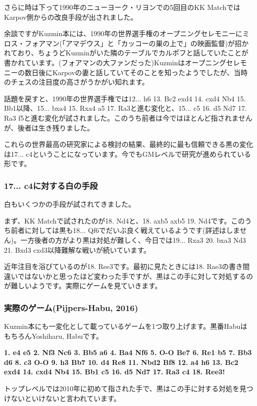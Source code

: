 さらに時は下って1990年のニューヨーク・リヨンでの5回目のKK MatchではKarpov側からの改良手段が出されました。

余談ですがKuzmin本には、1990年の世界選手権のオープニングセレモニーにミロス・フォアマン(「アマデウス」と「カッコーの巣の上で」の映画監督)が招かれており、ちょうどKuzminがいた隣のテーブルでカルポフと話していたことが書かれています。(フォアマンの大ファンだった)Kuzminはオープニングセレモニーの数日後にKarpovの妻と話していてそのことを知ったようでしたが、当時のチェスの注目度の高さがうかがい知れます。

話題を戻すと、1990年の世界選手権では12... h6 13. Bc2 exd4 14. cxd4 Nb4 15. Bb1以降、15... bxa4 15. Rxa4 a5 17. Ra3と進む変化と、15... c5 16. d5 Nd7 17. Ra3 f5と進む変化が試されました。このうち前者は今ではほとんど指されませんが、後者は生き残りました。

これらの世界最高の研究家による検討の結果、最終的に最も信頼できる黒の変化は17... c4ということになっています。今でもGMレベルで研究が進められている形です。

\subsubsection{17... c4に対する白の手段}
白もいくつかの手段が試されてきました。

まず、KK Matchで試されたのが18. Nd4と、18. axb5 axb5 19. Nd4です。このうち前者に対しては黒も18... Qf6でだいぶ良く戦えているようです(詳述はしません)。一方後者の方がより黒は対処が難しく、今日では19... Rxa3 20. bxa3 Nd3 21. Bxd3 cxd3以降難解な戦いが続いています。

近年注目を浴びているのが18. Ree3です。最初に見たときには18. Rae3の書き間違いではないかと思ったほど変わった手ですが、黒はこの手に対して対処するのが難しいようです。実際にゲームを見ていきます。

\subsubsection{実際のゲーム(Pijpers-Habu, 2016)}
Kuzmin本にも一変化として載っているゲームを1つ取り上げます。黒番HabuはもちろんYoshiharu, Habuです。

{\bf 1. e4 e5 2. Nf3 Nc6 3. Bb5 a6 4. Ba4 Nf6 5. O-O Be7 6. Re1 b5 7. Bb3 d6 8. c3 O-O 9. h3 Bb7 10. d4 Re8 11. Nbd2 Bf8 12. a4 h6 13. Bc2 exd4 14. cxd4 Nb4 15. Bb1 c5 16. d5 Nd7 17. Ra3 c4 18. Ree3!}

トップレベルでは2010年に初めて指された手で、黒はこの手に対する対処を見つけないといけないと言われています。

